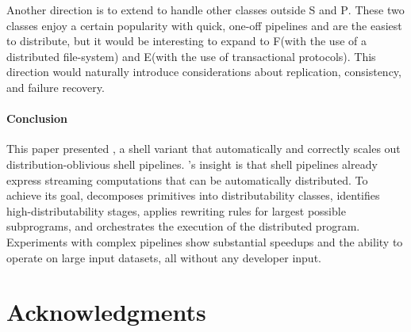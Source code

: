 \documentclass[letterpaper,twocolumn,10pt]{article}
\newcommand{\cn}[1]{\mbox{\textcircled{\footnotesize #1}}}
\newcommand{\pur}{\cn{\textsc{P}}\xspace}
\newcommand{\sta}{\cn{\textsc{S}}\xspace}
\newcommand{\dfs}{\cn{\textsc{F}}\xspace}
\newcommand{\sid}{\cn{\textsc{E}}\xspace}
\newcommand{\kk}[1]{[{\color{magenta}#1 --- kk}]}
\begin{document}
Another direction is to extend \sys to handle other classes outside \sta and \pur.
These two classes enjoy a certain popularity with quick, one-off pipelines and are the easiest to distribute, but 
it would be interesting to expand to \dfs (with the use of a distributed file-system) and \sid (with the use of transactional protocols).
This direction would naturally introduce considerations about replication, consistency, and failure recovery.


\paragraph{Conclusion}
This paper presented \sys, a shell variant that automatically and correctly scales out distribution-oblivious shell pipelines. 
\sys's insight is that shell pipelines already express streaming computations that can be automatically distributed.
To achieve its goal, \sys
  decomposes primitives into distributability classes,
  identifies high-distributability stages,
  applies rewriting rules for largest possible subprograms,
  and orchestrates the execution of the distributed program.
Experiments with complex pipelines show substantial speedups and the ability to operate on large input datasets, all without any developer input.

\section*{Acknowledgments}

\end{document}
